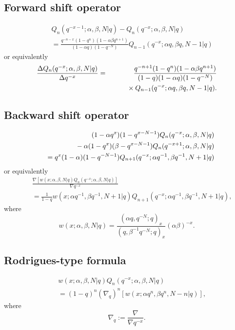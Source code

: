 \documentclass[envcountchap,graybox]{svmono}
\newcommand{\mathindent}{\hspace{7.5mm}}
\begin{document}
\subsection*{Forward shift operator}
\begin{eqnarray}
\label{shift1qHahnI}
& &Q_n(q^{-x-1};\alpha,\beta,N|q)-Q_n(q^{-x};\alpha,\beta,N|q)\nonumber\\
& &{}=\frac{q^{-n-x}(1-q^n)(1-\alpha\beta q^{n+1})}{(1-\alpha q)(1-q^{-N})}
Q_{n-1}(q^{-x};\alpha q,\beta q,N-1|q)
\end{eqnarray}
or equivalently
\begin{eqnarray}
\label{shift1qHahnII}
\frac{\Delta Q_n(q^{-x};\alpha,\beta,N|q)}{\Delta q^{-x}}
&=&\frac{q^{-n+1}(1-q^n)(1-\alpha\beta q^{n+1})}{(1-q)(1-\alpha q)(1-q^{-N})}\nonumber\\
& &{}\mathindent{}\times Q_{n-1}(q^{-x};\alpha q,\beta q,N-1|q).
\end{eqnarray}

\subsection*{Backward shift operator}
\begin{eqnarray}
\label{shift2qHahnI}
& &(1-\alpha q^x)(1-q^{x-N-1})Q_n(q^{-x};\alpha,\beta,N|q)\nonumber\\
& &{}\mathindent{}-\alpha(1-q^x)(\beta-q^{x-N-1})Q_n(q^{-x+1};\alpha,\beta,N|q)\nonumber\\
& &{}=q^x(1-\alpha)(1-q^{-N-1})Q_{n+1}(q^{-x};\alpha q^{-1},\beta q^{-1},N+1|q)
\end{eqnarray}
or equivalently
\begin{eqnarray}
\label{shift2qHahnII}
& &\frac{\nabla\left[w(x;\alpha,\beta,N|q)Q_n(q^{-x};\alpha,\beta,N|q)\right]}{\nabla q^{-x}}\nonumber\\
& &{}=\frac{1}{1-q}w(x;\alpha q^{-1},\beta q^{-1},N+1|q)Q_{n+1}(q^{-x};\alpha q^{-1},\beta q^{-1},N+1|q),
\end{eqnarray}
where
$$w(x;\alpha,\beta,N|q)=\frac{(\alpha q,q^{-N};q)_x}{(q,\beta^{-1}q^{-N};q)_x}(\alpha\beta)^{-x}.$$

\subsection*{Rodrigues-type formula}
\begin{eqnarray}
\label{RodqHahn}
& &w(x;\alpha,\beta,N|q)Q_n(q^{-x};\alpha,\beta,N|q)\nonumber\\
& &{}=(1-q)^n\left(\nabla_q\right)^n\left[w(x;\alpha q^n,\beta q^n,N-n|q)\right],
\end{eqnarray}
where
$$\nabla_q:=\frac{\nabla}{\nabla q^{-x}}.$$
\end{document}
